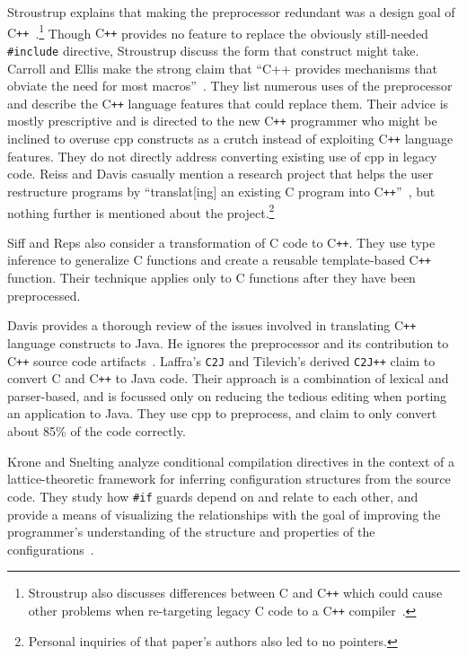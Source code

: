 \documentclass{article}
\newcommand{\Cpp}{\mbox{\textsf{cpp}}}
\newcommand{\CPP}{\mbox{\textsf{C\texttt{++}}}}
\newcommand{\C}{\mbox{\textsf{C}}}
\newcommand{\ppd}[1]{\texttt{\##1}}
\begin{document}
Stroustrup explains that making the preprocessor redundant was a design
goal of \CPP{}~\cite[p.~424]{Stroustrup94}.\footnote{Stroustrup also
  discusses differences between \C{} and \CPP{} which could cause other
  problems when re-targeting legacy \C{} code to a \CPP{}
  compiler~\cite[p.~816-820]{Stroustrup97}.} Though \CPP{} provides no
feature to replace the obviously still-needed \ppd{include} directive,
Stroustrup discuss the form that construct might take.  Carroll and
Ellis make the strong claim that ``C++ provides mechanisms that obviate
the need for most macros''~\cite[p.~147]{Carroll95}.  They list numerous
uses of the preprocessor and describe the \CPP{} language features that
could replace them.  Their advice is mostly prescriptive and is directed
to the new \CPP{} programmer who might be inclined to overuse \Cpp{}
constructs as a crutch instead of exploiting \CPP{} language features.
They do not directly address converting existing use of \Cpp{} in legacy
code.  Reiss and Davis casually mention a research project that helps
the user restructure programs by ``translat[ing] an existing \C{}
program into \CPP{}''~\cite[p.~2]{Reiss95}, but nothing further is
mentioned about the project.\footnote{Personal inquiries of that paper's
  authors also led to no pointers.}

Siff and Reps also consider a transformation of \C{} code to \CPP{}.
They use type inference to generalize \C{} functions and create a
reusable template-based \CPP{} function.  Their technique applies only
to  \C{} functions after they have been preprocessed.

Davis provides a thorough review of the issues involved in translating
\CPP{} language constructs to Java.  He ignores the preprocessor and its
contribution to \CPP{} source code artifacts~\cite{Davis97}.  Laffra's
\texttt{C2J} and Tilevich's derived \texttt{C2J++} claim to convert \C{} and
\CPP{} to Java code.  Their approach is a combination of lexical and
parser-based, and is focussed only on reducing the tedious editing when
porting an application to Java.  They use \Cpp{} to preprocess, and
claim to only convert about 85\% of the code correctly.

Krone and Snelting analyze conditional compilation directives in the
context of a lattice-theoretic framework for inferring configuration
structures from the source code.  They study how \ppd{if}
guards depend on and relate to each other, and provide a means of
visualizing the relationships with the goal of improving the
programmer's understanding of the structure and properties of the
configurations~\cite{Krone94}.
\end{document}
